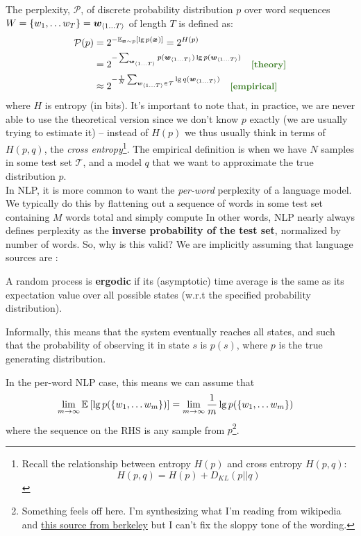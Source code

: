 \documentclass[11pt]{article}
\begin{document}
The perplexity, $\mathcal P$, of discrete probability distribution $p$ over word sequences $W = \seq[T]{w} = \slice[T]{w}$ of length $T$ is defined as:
\begin{align}
	\mathcal P (p)
		&= 2^{ - \E[\vec x \sim p]{\lg p(\vec x)} }  = 2^{H(p)} \\
		&= 2^{-\sum_{ \slice[T]{w} } p( \slice[T]{w} ) \lg p( \slice[T]{w} ) } \quad \mtgreen{[theory]} \\
		&\approx 2^{- \inv{N} \sum_{ \slice[T]{w} \in \mathcal T  }  \lg q( \slice[T]{w} ) } \quad \mtgreen{[empirical]}
\end{align}
where $H$ is entropy (in bits). It's important to note that, in practice, we are never able to use the theoretical version since we don't know $p$ exactly (we are usually trying to estimate it) -- instead of $H(p)$ we thus usually think in terms of $H(p, q)$, the \textit{cross entropy}\footnote{Recall the relationship between entropy $H(p)$ and cross entropy $H(p, q)$: $$H(p, q) = H(p) + D_{KL}(p || q)$$}. The empirical definition is when we have $N$ samples in some test set $\mathcal T$, and a model $q$ that we want to approximate the true distribution $p$. \\

In NLP, it is more common to want the \textit{per-word} perplexity of a language model. We typically do this by flattening out a sequence of words in some test set containing $M$ words total and simply compute
In other words, NLP nearly always defines perplexity as the \textbf{inverse probability of the test set}, normalized by number of words. So, why is this valid? We are implicitly assuming that language sources are :

\begin{definition}[-1em][Ergodic]
	A random process is \textbf{ergodic} if its (asymptotic) time average is the same as its expectation value over all possible states (w.r.t the specified probability distribution). 
	
	Informally, this means that the system eventually reaches all states, and such that the probability of observing it in state $s$ is $p(s)$, where $p$ is the true generating distribution. 
\end{definition}
In the per-word NLP case, this means we can assume that
\begin{align}
	\lim_{m \rightarrow \infty} \E{\lg p(\seq[m]{w})}
		&=
	\lim_{m \rightarrow \infty} \inv{m} \lg p(\seq[m]{w})
\end{align}
where the sequence on the RHS is any sample from $p$\footnote{Something feels off here. I'm synthesizing what I'm reading from wikipedia and \href{http://www1.icsi.berkeley.edu/Speech/docs/HTKBook3.2/node188_mn.html}{this source from berkeley} but I can't fix the sloppy tone of the wording.}.
\end{document}
